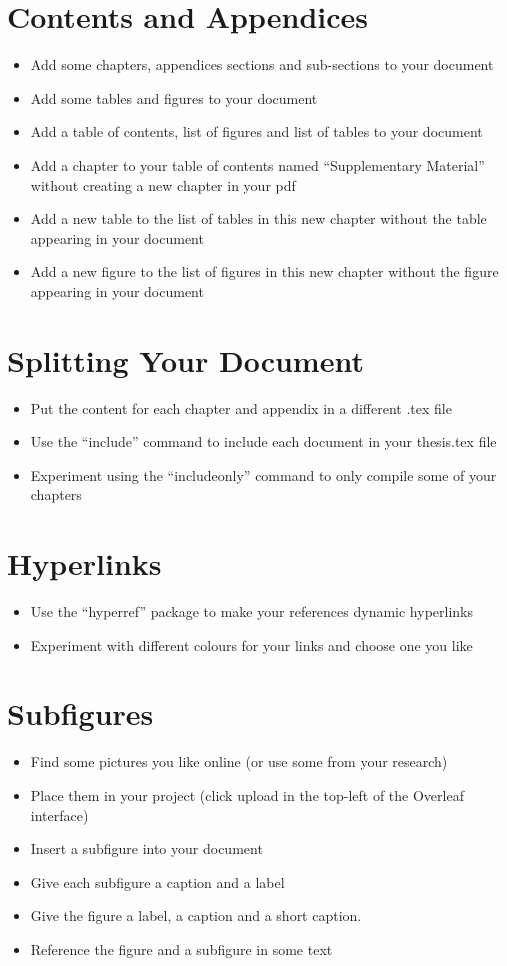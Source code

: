 \documentclass[11pt,a4paper]{article}
\begin{document}
\section{Contents and Appendices}
\begin{itemize}
\item Add some chapters, appendices sections and sub-sections to your document
\item Add some tables and figures to your document
\item Add a table of contents, list of figures and list of tables to your document
\item Add a chapter to your table of contents named ``Supplementary Material'' without creating a new chapter in your pdf
\item Add a new table to the list of tables in this new chapter without the table appearing in your document
\item Add a new figure to the list of figures in this new chapter without the figure appearing in your document
\end{itemize}

\section{Splitting Your Document}
\begin{itemize}
\item Put the content for each chapter and appendix in a different .tex file
\item Use the ``include'' command to include each document in your thesis.tex file
\item Experiment using the ``includeonly'' command to only compile some of your chapters
\end{itemize}

\section{Hyperlinks}
\begin{itemize}
\item Use the ``hyperref'' package to make your references dynamic hyperlinks
\item Experiment with different colours for your links and choose one you like
\end{itemize}

\section{Subfigures}
\begin{itemize}
\item Find some pictures you like online (or use some from your research)
\item Place them in your project (click upload in the top-left of the Overleaf interface)
\item Insert a subfigure into your document
\item Give each subfigure a caption and a label
\item Give the figure a label, a caption and a short caption.
\item Reference the figure and a subfigure in some text
\end{itemize}
\end{document}
